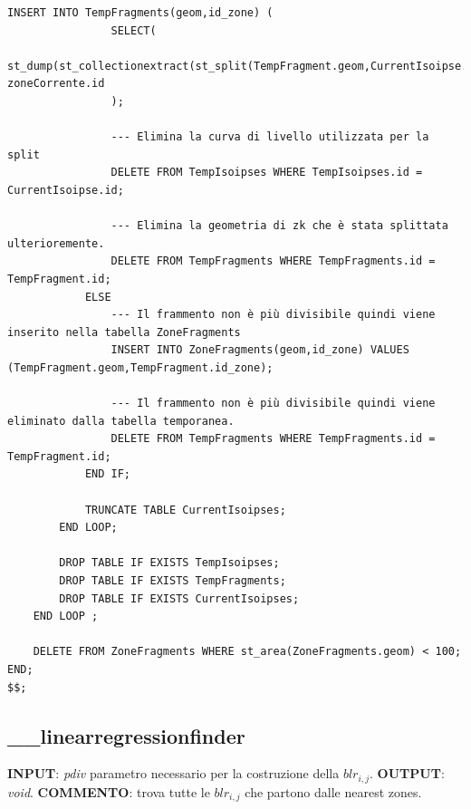\begin{lstlisting}[style = mystyle]
				INSERT INTO TempFragments(geom,id_zone) (
				SELECT(
					st_dump(st_collectionextract(st_split(TempFragment.geom,CurrentIsoipse.geom),3))).geom, zoneCorrente.id
				);
				
				--- Elimina la curva di livello utilizzata per la split
				DELETE FROM TempIsoipses WHERE TempIsoipses.id = CurrentIsoipse.id;
				
				--- Elimina la geometria di zk che è stata splittata ulterioremente.
				DELETE FROM TempFragments WHERE TempFragments.id = TempFragment.id;
			ELSE
				--- Il frammento non è più divisibile quindi viene inserito nella tabella ZoneFragments
				INSERT INTO ZoneFragments(geom,id_zone) VALUES (TempFragment.geom,TempFragment.id_zone);
				
				--- Il frammento non è più divisibile quindi viene eliminato dalla tabella temporanea.
				DELETE FROM TempFragments WHERE TempFragments.id = TempFragment.id;
			END IF;
			
			TRUNCATE TABLE CurrentIsoipses;
		END LOOP;

		DROP TABLE IF EXISTS TempIsoipses;
		DROP TABLE IF EXISTS TempFragments;
		DROP TABLE IF EXISTS CurrentIsoipses;
	END LOOP ;
	
	DELETE FROM ZoneFragments WHERE st_area(ZoneFragments.geom) < 100;
END;
$$;

\end{lstlisting}

\newpage
\subsection{\_\_linearregressionfinder}
\textbf{INPUT}: \textit{pdiv} parametro necessario per la costruzione della $blr_{i,j}$. \newline
\textbf{OUTPUT}: \textit{void}. \newline
\textbf{COMMENTO}: trova tutte le $blr_{i,j}$ che partono dalle nearest zones.

